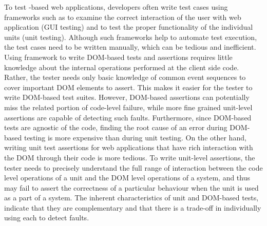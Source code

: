 To test \javascript-based web applications, developers
often write test cases using frameworks such as \selenium to examine the correct interaction of the user with web application (GUI testing) and \qunit to test the proper functionality of the individual units (unit testing).
Although such frameworks help to automate test execution, the
test cases need to be written manually, which can be tedious
and inefficient. 
Using \selenium framework to write DOM-based tests and assertions
requires little knowledge about the internal operations performed at the client side code. Rather, the tester needs only basic knowledge of common event sequences to cover important DOM elements to assert. 
This makes it easier for the tester to write DOM-based test suites. However, DOM-based assertions can potentially miss the related portion of
code-level failure, while more fine grained unit-level assertions are capable of detecting such faults. Furthermore, since DOM-based tests are agnostic of the \javascript code, finding the root cause of an error during DOM-based testing is more expensive than during unit testing. On the other hand,
writing unit test assertions for web applications that have rich interaction with the DOM through their \javascript code is more tedious. 
To write unit-level assertions, the tester needs to precisely understand the full range of interaction between the code level operations of a unit and the DOM level operations of a system, and thus may fail to assert the correctness of a particular behaviour when the unit is used as a part of a system. The inherent characteristics of unit and DOM-based tests, indicate that they are complementary and that there is a trade-off in individually using each to detect faults. 


